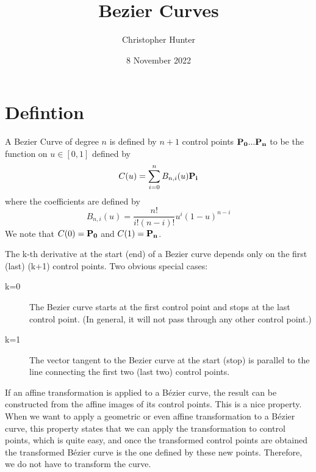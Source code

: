 \documentclass[11pt]{amsart}
\title{Bezier Curves}
\author{Christopher Hunter}
\date{8 November 2022}                                           %
\begin{document}
\maketitle
\section{Defintion}
A Bezier Curve of degree $n$ is defined by $n+1$ control points $\bf P_0 ... P_n$ to be the function on $u \in [0,1]$ defined by
\begin{equation}
C(u) = \sum_{i=0}^n B_{n,i}(u){\bf P_i}
\end{equation}
where the coefficients are defined by
\begin{equation}
B_{n,i}(u)=\frac{n!}{i!(n-i)!}u^i(1-u)^{n-i}
\end{equation}
We note that $C(0) = \bf P_0$ and $C(1) = \bf P_n$.


The k-th derivative at the start (end) of a Bezier curve depends only on the first (last) (k+1) control points. Two obvious special cases:
\begin{description}
\item[k=0] The Bezier curve starts at the first control point and stops at the last control point. (In general, it will not pass through any other control point.)
\item[k=1] The vector tangent to the Bezier curve at the start (stop) is parallel to the line connecting the first two (last two) control points.
\end{description}

If an affine transformation is applied to a Bézier curve, the result can be constructed from the affine images of its control points. This is a nice property. When we want to apply a geometric or even affine transformation to a Bézier curve, this property states that we can apply the transformation to control points, which is quite easy, and once the transformed control points are obtained the transformed Bézier curve is the one defined by these new points. Therefore, we do not have to transform the curve.
\end{document}
